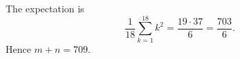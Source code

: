The expectation is
\[
\dfrac{1}{18}\sum_{k=1}^{18}k^2
=\dfrac{19\cdot37}{6}=\dfrac{703}{6}.
\]
Hence $\boxed{m+n=709}$.

